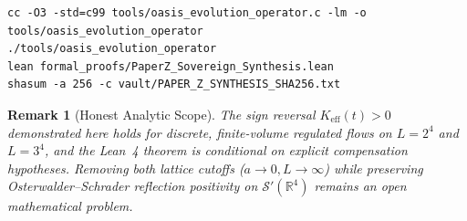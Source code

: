 \documentclass[11pt,a4paper]{article}
\newtheorem{remark}{Remark}[section]
\begin{document}
\begin{verbatim}
cc -O3 -std=c99 tools/oasis_evolution_operator.c -lm -o tools/oasis_evolution_operator
./tools/oasis_evolution_operator
lean formal_proofs/PaperZ_Sovereign_Synthesis.lean
shasum -a 256 -c vault/PAPER_Z_SYNTHESIS_SHA256.txt
\end{verbatim}

\begin{remark}[Honest Analytic Scope]
The sign reversal $K_{\mathrm{eff}}(t) > 0$ demonstrated here holds for discrete, finite-volume regulated flows on $L=2^4$ and $L=3^4$, and the Lean~4 theorem is conditional on explicit compensation hypotheses. Removing both lattice cutoffs ($a \to 0, L \to \infty$) while preserving Osterwalder--Schrader reflection positivity on $\mathcal{S}'(\mathbb{R}^4)$ remains an open mathematical problem.
\end{remark}
\end{document}
